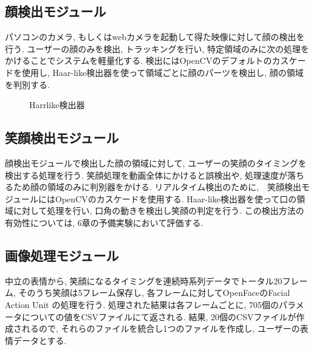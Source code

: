 \subsection{顔検出モジュール}
パソコンのカメラ, もしくはwebカメラを起動して得た映像に対して顔の検出を行う.
ユーザーの顔のみを検出, トラッキングを行い, 特定領域のみに次の処理をかけることでシステムを軽量化する.
検出にはOpenCVのデフォルトのカスケードを使用し, Haar-like検出器を使って領域ごとに顔のパーツを検出し,
顔の領域を判別する.

\begin{figure}[htbp]
    \begin{center}
    \end{center}
    \caption{Harr\-like検出器}
    \label{fig:haarlikedetector}
\end{figure}

\subsection{笑顔検出モジュール}
顔検出モジュールで検出した顔の領域に対して, ユーザーの笑顔のタイミングを検出する処理を行う.
笑顔処理を動画全体にかけると誤検出や,  処理速度が落ちるため顔の領域のみに判別器をかける.
リアルタイム検出のために,　笑顔検出モジュールにはOpenCVのカスケードを使用する.
Haar-like検出器を使って口の領域に対して処理を行い, 口角の動きを検出し笑顔の判定を行う.
この検出方法の有効性については, 6章の予備実験において評価する.

\subsection{画像処理モジュール}
中立の表情から, 笑顔になるタイミングを連続時系列データでトータル20フレーム, そのうち笑顔は5フレーム保存し,
各フレームに対してOpenFaceのFacial Action Unit の処理を行う.
処理された結果は各フレームごとに, 705個のパラメータについての値をCSVファイルにて返される.
結果, 20個のCSVファイルが作成されるので, それらのファイルを統合し1つのファイルを作成し,
ユーザーの表情データとする.

